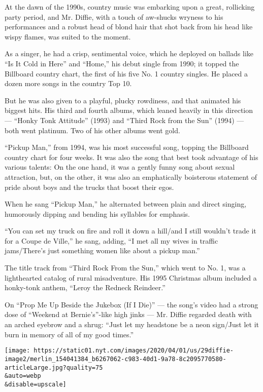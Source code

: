 At the dawn of the 1990s, country music was embarking upon a great,
rollicking party period, and Mr. Diffie, with a touch of aw-shucks
wryness to his performances and a robust head of blond hair that shot
back from his head like wispy flames, was suited to the moment.

As a singer, he had a crisp, sentimental voice, which he deployed on
ballads like ``Is It Cold in Here'' and ``Home,'' his debut single from
1990; it topped the Billboard country chart, the first of his five No. 1
country singles. He placed a dozen more songs in the country Top 10.

But he was also given to a playful, plucky rowdiness, and that animated
his biggest hits. His third and fourth albums, which leaned heavily in
this direction --- ``Honky Tonk Attitude'' (1993) and ``Third Rock from
the Sun'' (1994) --- both went platinum. Two of his other albums went
gold.

``Pickup Man,'' from 1994, was his most successful song, topping the
Billboard country chart for four weeks. It was also the song that best
took advantage of his various talents: On the one hand, it was a gently
funny song about sexual attraction, but, on the other, it was also an
emphatically boisterous statement of pride about boys and the trucks
that boost their egos.

When he sang ``Pickup Man,'' he alternated between plain and direct
singing, humorously dipping and bending his syllables for emphasis.

``You can set my truck on fire and roll it down a hill/and I still
wouldn't trade it for a Coupe de Ville,'' he sang, adding, ``I met all
my wives in traffic jams/There's just something women like about a
pickup man.''

The title track from ``Third Rock From the Sun,'' which went to No. 1,
was a lighthearted catalog of rural misadventure. His 1995 Christmas
album included a honky-tonk anthem, ``Leroy the Redneck Reindeer.''

On ``Prop Me Up Beside the Jukebox (If I Die)'' --- the song's video had
a strong dose of ``Weekend at Bernie's''-like high jinks --- Mr. Diffie
regarded death with an arched eyebrow and a shrug: ``Just let my
headstone be a neon sign/Just let it burn in memory of all of my good
times.''

\texttt{[image: https://static01.nyt.com/images/2020/04/01/us/29diffie-image2/merlin\_154041384\_b6267062-c983-40d1-9a78-8c2095770580-articleLarge.jpg?quality=75\\\&auto=webp\\\&disable=upscale]}

